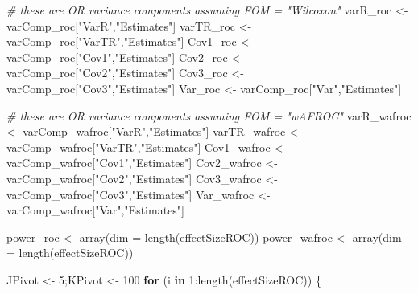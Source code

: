 \documentclass[
]{book}
\newenvironment{Shaded}{\begin{snugshade}}{\end{snugshade}}
\newcommand{\AttributeTok}[1]{\textcolor[rgb]{0.77,0.63,0.00}{#1}}
\newcommand{\CommentTok}[1]{\textcolor[rgb]{0.56,0.35,0.01}{\textit{#1}}}
\newcommand{\ControlFlowTok}[1]{\textcolor[rgb]{0.13,0.29,0.53}{\textbf{#1}}}
\newcommand{\DecValTok}[1]{\textcolor[rgb]{0.00,0.00,0.81}{#1}}
\newcommand{\FunctionTok}[1]{\textcolor[rgb]{0.00,0.00,0.00}{#1}}
\newcommand{\NormalTok}[1]{#1}
\newcommand{\OtherTok}[1]{\textcolor[rgb]{0.56,0.35,0.01}{#1}}
\newcommand{\SpecialCharTok}[1]{\textcolor[rgb]{0.00,0.00,0.00}{#1}}
\newcommand{\StringTok}[1]{\textcolor[rgb]{0.31,0.60,0.02}{#1}}
\begin{document}
\begin{Shaded}
\begin{Highlighting}[numbers=left,,]
\CommentTok{\# these are OR variance components assuming FOM = "Wilcoxon"}
\NormalTok{varR\_roc }\OtherTok{\textless{}{-}}\NormalTok{ varComp\_roc[}\StringTok{"VarR"}\NormalTok{,}\StringTok{"Estimates"}\NormalTok{]}
\NormalTok{varTR\_roc }\OtherTok{\textless{}{-}}\NormalTok{ varComp\_roc[}\StringTok{"VarTR"}\NormalTok{,}\StringTok{"Estimates"}\NormalTok{]}
\NormalTok{Cov1\_roc }\OtherTok{\textless{}{-}}\NormalTok{ varComp\_roc[}\StringTok{"Cov1"}\NormalTok{,}\StringTok{"Estimates"}\NormalTok{]}
\NormalTok{Cov2\_roc }\OtherTok{\textless{}{-}}\NormalTok{ varComp\_roc[}\StringTok{"Cov2"}\NormalTok{,}\StringTok{"Estimates"}\NormalTok{]}
\NormalTok{Cov3\_roc }\OtherTok{\textless{}{-}}\NormalTok{ varComp\_roc[}\StringTok{"Cov3"}\NormalTok{,}\StringTok{"Estimates"}\NormalTok{]}
\NormalTok{Var\_roc }\OtherTok{\textless{}{-}}\NormalTok{ varComp\_roc[}\StringTok{"Var"}\NormalTok{,}\StringTok{"Estimates"}\NormalTok{]}

\CommentTok{\# these are OR variance components assuming FOM = "wAFROC"}
\NormalTok{varR\_wafroc }\OtherTok{\textless{}{-}}\NormalTok{ varComp\_wafroc[}\StringTok{"VarR"}\NormalTok{,}\StringTok{"Estimates"}\NormalTok{]}
\NormalTok{varTR\_wafroc }\OtherTok{\textless{}{-}}\NormalTok{ varComp\_wafroc[}\StringTok{"VarTR"}\NormalTok{,}\StringTok{"Estimates"}\NormalTok{]}
\NormalTok{Cov1\_wafroc }\OtherTok{\textless{}{-}}\NormalTok{ varComp\_wafroc[}\StringTok{"Cov1"}\NormalTok{,}\StringTok{"Estimates"}\NormalTok{]}
\NormalTok{Cov2\_wafroc }\OtherTok{\textless{}{-}}\NormalTok{ varComp\_wafroc[}\StringTok{"Cov2"}\NormalTok{,}\StringTok{"Estimates"}\NormalTok{]}
\NormalTok{Cov3\_wafroc }\OtherTok{\textless{}{-}}\NormalTok{ varComp\_wafroc[}\StringTok{"Cov3"}\NormalTok{,}\StringTok{"Estimates"}\NormalTok{]}
\NormalTok{Var\_wafroc }\OtherTok{\textless{}{-}}\NormalTok{ varComp\_wafroc[}\StringTok{"Var"}\NormalTok{,}\StringTok{"Estimates"}\NormalTok{]}

\NormalTok{power\_roc }\OtherTok{\textless{}{-}} \FunctionTok{array}\NormalTok{(}\AttributeTok{dim =} \FunctionTok{length}\NormalTok{(effectSizeROC))}
\NormalTok{power\_wafroc }\OtherTok{\textless{}{-}} \FunctionTok{array}\NormalTok{(}\AttributeTok{dim =} \FunctionTok{length}\NormalTok{(effectSizeROC))}

\NormalTok{JPivot }\OtherTok{\textless{}{-}} \DecValTok{5}\NormalTok{;KPivot }\OtherTok{\textless{}{-}} \DecValTok{100}
\ControlFlowTok{for}\NormalTok{ (i }\ControlFlowTok{in} \DecValTok{1}\SpecialCharTok{:}\FunctionTok{length}\NormalTok{(effectSizeROC)) \{}
  

\end{Highlighting}
\end{Shaded}
\end{document}

